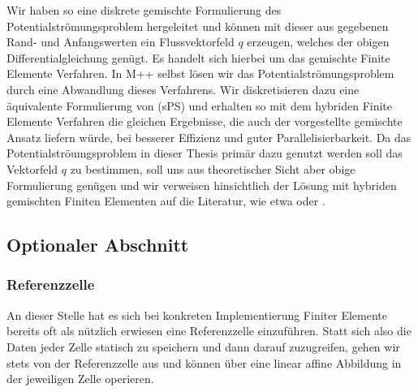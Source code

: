 Wir haben so eine diskrete gemischte Formulierung des Potentialströmungsproblem hergeleitet und können mit dieser aus gegebenen Rand- und Anfangswerten ein Flussvektorfeld $q$ erzeugen, welches der obigen Differentialgleichung genügt.
Es handelt sich hierbei um das gemischte Finite Elemente Verfahren. In M++ selbst lösen wir das Potentialströmungsproblem durch eine Abwandlung dieses Verfahrens. Wir diskretisieren dazu eine äquivalente Formulierung von (sPS) und erhalten so mit dem hybriden Finite Elemente Verfahren die gleichen Ergebnisse, die auch der vorgestellte gemischte Ansatz liefern würde, bei besserer Effizienz und guter Parallelisierbarkeit. Da das Potentialströumgsproblem in dieser Thesis primär dazu genutzt werden soll das Vektorfeld $q$ zu bestimmen, soll uns aus theoretischer Sicht aber obige Formulierung genügen und wir verweisen hinsichtlich der Lösung mit hybriden gemischten Finiten Elementen auf die Literatur, wie etwa \cite{brezzi2012mixed} oder  \cite{roberts1991mixed}.




\subsection{Optionaler Abschnitt}
\subsubsection{Referenzzelle}
An dieser Stelle hat es sich bei konkreten Implementierung Finiter Elemente bereits oft als nützlich erwiesen eine Referenzzelle einzuführen. Statt sich also die Daten jeder Zelle statisch zu speichern und dann darauf zuzugreifen, gehen wir stets von der Referenzzelle aus und können über eine linear affine Abbildung in der jeweiligen Zelle operieren.

